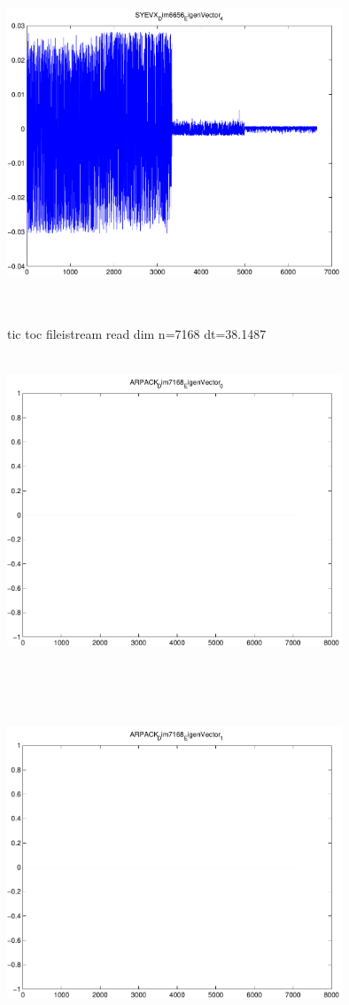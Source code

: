 \documentclass[9pt]{article}
\theoremstyle{plain}
\theoremstyle{definition}
\theoremstyle{remark}
\numberwithin{equation}{section}
\begin{document}
\includegraphics[width=10.0cm,height=10.0cm]{SYEVX_Dim6656_EigenVector_4.pdf}

tic toc fileistream read dim n=7168 dt=38.1487
\includegraphics[width=10.0cm,height=10.0cm]{ARPACK_Dim7168_EigenVector_0.pdf}

\includegraphics[width=10.0cm,height=10.0cm]{ARPACK_Dim7168_EigenVector_1.pdf}
\end{document}
